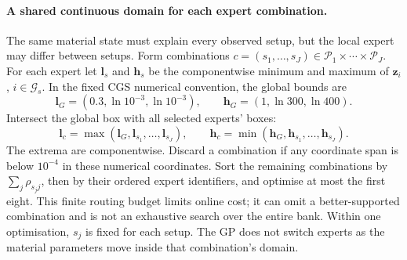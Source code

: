 \paragraph{A shared continuous domain for each expert combination.}
\label{sec:inv-box}
The same material state must explain every observed setup, but the local
expert may differ between setups. Form combinations
$c=(s_1,\ldots,s_J)\in\mathcal P_1\times\cdots\times\mathcal P_J$.
For each expert let $\mathbf l_s$ and $\mathbf h_s$ be the componentwise
minimum and maximum of $\mathbf z_i$, $i\in\mathcal G_s$.
In the fixed CGS numerical convention, the global bounds are
\begin{equation}
\label{eq:inverse-global-box}
 \mathbf l_G=(0.3,\ln10^{-3},\ln10^{-3}),\qquad
 \mathbf h_G=(1,\ln300,\ln400).
\end{equation}
Intersect the global box with all selected experts' boxes:
\begin{equation}
\label{eq:inverse-combination-box}
 \mathbf l_c=\max(\mathbf l_G,\mathbf l_{s_1},\ldots,\mathbf l_{s_J}),
 \qquad
 \mathbf h_c=\min(\mathbf h_G,\mathbf h_{s_1},\ldots,\mathbf h_{s_J}).
\end{equation}
The extrema are componentwise. Discard a combination if any coordinate
span is below $10^{-4}$ in these numerical coordinates. Sort the remaining
combinations by $\sum_j\rho_{s_jj}$, then by their ordered expert identifiers,
and optimise at most the first eight. This finite routing budget limits
online cost; it can omit a better-supported combination and is not an
exhaustive search over the entire bank. Within one optimisation, $s_j$ is
fixed for each setup. The GP does not switch experts as the material
parameters move inside that combination's domain.

